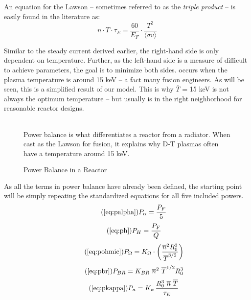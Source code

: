 An equation for the Lawson  -- sometimes referred to as the \emph{triple product} -- is easily found in the literature as:
\begin{equation}
	\label{eq:lawson}
	n \cdot T \cdot \tau_E = \frac{ 60 }{ E_F } \cdot \frac{ T ^ 2 }{ \langle \sigma v \rangle }
\end{equation}

Similar to the steady current derived earlier, the right-hand side is only dependent on temperature. Further, as the left-hand side is a measure of difficult to achieve parameters, the goal is to minimize both sides.  occurs when the plasma temperature is around 15 keV -- a fact  many fusion engineers. As will be seen, this is a simplified result of our model. This is why $\overline T$ = 15 keV is not always the optimum temperature -- but usually is in the right neighborhood for reasonable reactor designs.

\begin{figure}
	\centering
	\begin{adjustbox}{width=0.75\textwidth}
		
	\end{adjustbox}
	\caption{Power Balance in a Reactor} ~\\
	\small Power balance is what differentiates a reactor from a radiator. When cast as the Lawson  for fusion, it explains why D-T plasmas often have a temperature around 15 keV.
	\label{fig:lawson}
\end{figure}

As all the terms in power balance have already been defined, the starting point will be simply repeating the standardized equations for all five included powers.
\begin{equation}
	\tag{\ref{eq:palpha}}
	P_\alpha = \frac{P_F}{5}
\end{equation}
\begin{equation}
	\tag{\ref{eq:ph}}
	P_H = \frac{P_F}{Q}
\end{equation}
\begin{equation}
	\tag{\ref{eq:pohmic}}
	P_\Omega = K_\Omega \cdot \left( \frac{ \overline n ^ 2 R_0^3 }{\overline T ^ {3/2}} \right)
\end{equation}
\begin{equation}
	\tag{\ref{eq:pbr}}
	P_{BR} = K_{BR} \ \overline n ^ 2 \ \overline T ^ {1/2} R_0^3 
\end{equation}
\begin{equation}
	\tag{\ref{eq:pkappa}}
	P_\kappa = K_\kappa \, \frac{ R_0 ^ 3 \ \overline{n}  \ \overline{T}  }{\tau_E} 
\end{equation}

